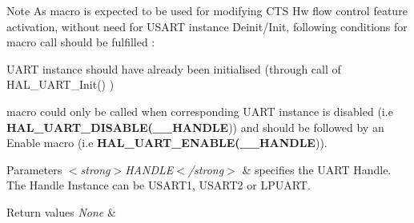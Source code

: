 \begin{DoxyNote}{Note}
As macro is expected to be used for modifying C\+TS Hw flow control feature activation, without need for U\+S\+A\+RT instance Deinit/\+Init, following conditions for macro call should be fulfilled \+:
\begin{DoxyItemize}
\item U\+A\+RT instance should have already been initialised (through call of H\+A\+L\+\_\+\+U\+A\+R\+T\+\_\+\+Init() )
\item macro could only be called when corresponding U\+A\+RT instance is disabled (i.\+e {\bfseries H\+A\+L\+\_\+\+U\+A\+R\+T\+\_\+\+D\+I\+S\+A\+B\+LE(\+\_\+\+\_\+\+H\+A\+N\+D\+LE})) and should be followed by an Enable macro (i.\+e {\bfseries H\+A\+L\+\_\+\+U\+A\+R\+T\+\_\+\+E\+N\+A\+B\+LE(\+\_\+\+\_\+\+H\+A\+N\+D\+LE})). 
\end{DoxyItemize}
\end{DoxyNote}

\begin{DoxyParams}{Parameters}
{\em $<$strong$>$\+H\+A\+N\+D\+L\+E$<$/strong$>$} & specifies the U\+A\+RT Handle. The Handle Instance can be U\+S\+A\+R\+T1, U\+S\+A\+R\+T2 or L\+P\+U\+A\+RT. \\
\hline
\end{DoxyParams}

\begin{DoxyRetVals}{Return values}
{\em None} & \\
\hline
\end{DoxyRetVals}
